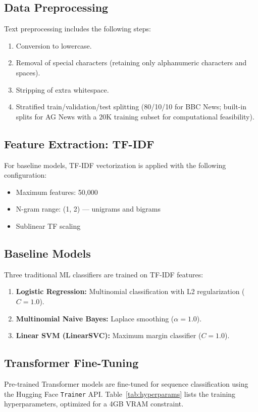 \documentclass[12pt, a4paper]{article}
\begin{document}
\subsection{Data Preprocessing}
Text preprocessing includes the following steps:
\begin{enumerate}
    \item Conversion to lowercase.
    \item Removal of special characters (retaining only alphanumeric characters and spaces).
    \item Stripping of extra whitespace.
    \item Stratified train/validation/test splitting (80/10/10 for BBC News; built-in splits for AG News with a 20K training subset for computational feasibility).
\end{enumerate}

\subsection{Feature Extraction: TF-IDF}
For baseline models, TF-IDF vectorization is applied with the following configuration:
\begin{itemize}
    \item Maximum features: 50,000
    \item N-gram range: (1, 2) — unigrams and bigrams
    \item Sublinear TF scaling
\end{itemize}

\subsection{Baseline Models}
Three traditional ML classifiers are trained on TF-IDF features:
\begin{enumerate}
    \item \textbf{Logistic Regression:} Multinomial classification with L2 regularization ($C=1.0$).
    \item \textbf{Multinomial Naive Bayes:} Laplace smoothing ($\alpha=1.0$).
    \item \textbf{Linear SVM (LinearSVC):} Maximum margin classifier ($C=1.0$).
\end{enumerate}

\subsection{Transformer Fine-Tuning}
Pre-trained Transformer models are fine-tuned for sequence classification using the Hugging Face \texttt{Trainer} API. Table~\ref{tab:hyperparams} lists the training hyperparameters, optimized for a 4GB VRAM constraint.
\end{document}
